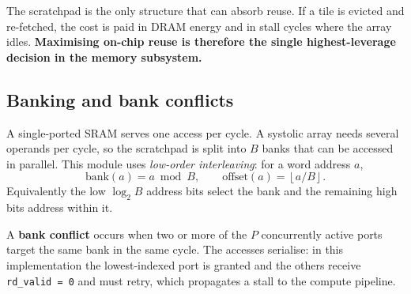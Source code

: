 \documentclass[11pt,a4paper]{article}
\begin{document}
\begin{center}
\end{center}

\noindent
The scratchpad is the only structure that can absorb reuse. If a tile is
evicted and re-fetched, the cost is paid in DRAM energy and in stall cycles
where the array idles. \textbf{Maximising on-chip reuse is therefore the single
highest-leverage decision in the memory subsystem.}

\subsection{Banking and bank conflicts}
\label{sec:banking}

A single-ported SRAM serves one access per cycle. A systolic array needs
several operands per cycle, so the scratchpad is split into $B$ banks that can
be accessed in parallel. This module uses \emph{low-order interleaving}: for a
word address $a$,
\[
  \text{bank}(a) = a \bmod B, \qquad
  \text{offset}(a) = \left\lfloor a / B \right\rfloor .
\]
Equivalently the low $\log_2 B$ address bits select the bank and the remaining
high bits address within it.

A \textbf{bank conflict} occurs when two or more of the $P$ concurrently active
ports target the same bank in the same cycle. The accesses serialise: in this
implementation the lowest-indexed port is granted and the others receive
\texttt{rd\_valid = 0} and must retry, which propagates a stall to the compute
pipeline.
\end{document}
